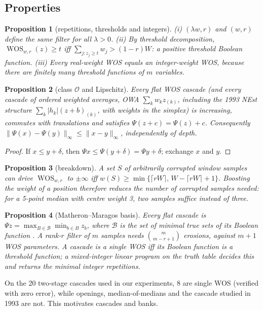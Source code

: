 \documentclass[11pt,a4paper]{article}
\newtheorem{proposition}{Proposition}
\theoremstyle{definition}
\theoremstyle{remark}
\newcommand{\WOS}{\operatorname{WOS}}
\begin{document}
\subsection{Properties}
\begin{proposition}[repetitions, thresholds and integers]\label{prop:thr}
(i) $(\lambda w,r)$ and $(w,r)$ define the same filter for all $\lambda>0$.
(ii) By threshold decomposition, $\WOS_{w,r}(z)\ge t$ iff $\sum_{j:z_j\ge t}w_j>(1-r)W$: a positive threshold Boolean function.
(iii) Every real-weight WOS equals an integer-weight WOS, because there are finitely many threshold functions of $m$ variables.
\end{proposition}

\begin{proposition}[class $\mathcal O$ and Lipschitz]\label{prop:lip}
Every flat WOS cascade (and every cascade of ordered weighted averages, OWA $\sum_kw_kz_{(k)}$, including the 1993
NEst structure $\sum_k|h_k|(z+b)_{(k)}$, with weights in the simplex) is increasing, commutes with translations
and satisfies $\Psi(z+c)=\Psi(z)+c$. Consequently $\|\Psi(x)-\Psi(y)\|_\infty\le\|x-y\|_\infty$, independently of depth.
\end{proposition}
\begin{proof}
If $x\le y+\delta$, then $\Psi x\le\Psi(y+\delta)=\Psi y+\delta$; exchange $x$ and $y$.
\end{proof}

\begin{proposition}[breakdown]\label{prop:bp}
A set $S$ of arbitrarily corrupted window samples can drive $\WOS_{w,r}$ to $\pm\infty$ iff
$w(S)\ge\min\{\lceil rW\rceil,\,W-\lceil rW\rceil+1\}$. Boosting the weight of a position therefore \emph{reduces} the
number of corrupted samples needed: for a 5-point median with centre weight 3, two samples suffice instead of three.
\end{proposition}

\begin{proposition}[Matheron--Maragos basis]\label{prop:basis}
Every flat cascade is $\Psi z=\max_{B\in\mathcal B}\min_{b\in B}z_b$, where $\mathcal B$ is the set of minimal true sets
of its Boolean function \cite{matheron1975,maragos1989}. A rank-$r$ filter of $m$ samples needs $\binom{m}{m-r+1}$
erosions, against $m{+}1$ WOS parameters. A cascade is a single WOS iff its Boolean function is a threshold function;
a mixed-integer linear program on the truth table decides this and returns the minimal integer repetitions.
\end{proposition}
On the 20 two-stage cascades used in our experiments, 8 are single WOS (verified with zero error), while openings,
median-of-medians and the cascade studied in 1993 are not. This motivates cascades and banks.
\end{document}

